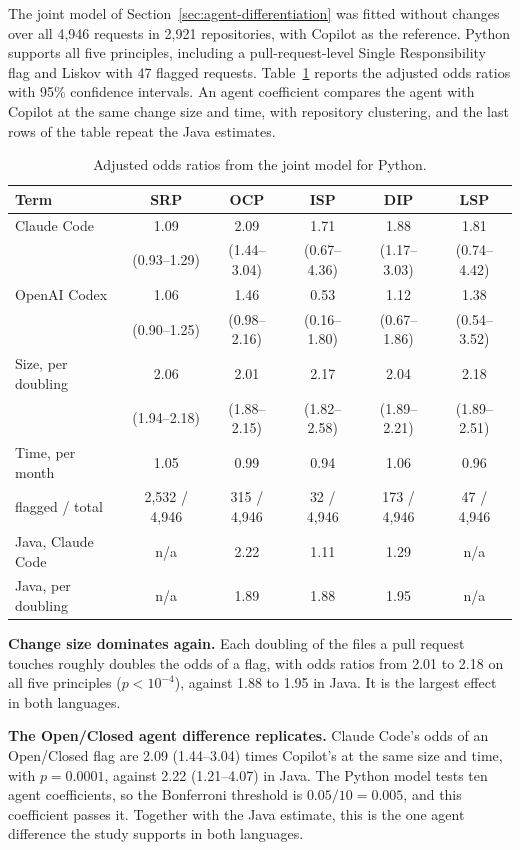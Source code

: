 The joint model of Section~\ref{sec:agent-differentiation} was fitted without changes over all
4{,}946 requests in 2{,}921 repositories, with Copilot as the reference. Python supports all five
principles, including a pull-request-level Single Responsibility flag and Liskov with 47 flagged
requests. Table~\ref{tab:py-model} reports the adjusted odds ratios with 95\% confidence intervals. An
agent coefficient compares the agent with Copilot at the same change size and time, with repository
clustering, and the last rows of the table repeat the Java estimates.

\begin{table}[htb]
\centering
\caption{Adjusted odds ratios from the joint model for Python.}
\label{tab:py-model}
\small
\begin{tabular}{@{}lccccc@{}}
\toprule
\textbf{Term} & \textbf{SRP} & \textbf{OCP} & \textbf{ISP} & \textbf{DIP} & \textbf{LSP} \\
\midrule
Claude Code & 1.09 & 2.09 & 1.71 & 1.88 & 1.81 \\
 & (0.93--1.29) & (1.44--3.04) & (0.67--4.36) & (1.17--3.03) & (0.74--4.42) \\
OpenAI Codex & 1.06 & 1.46 & 0.53 & 1.12 & 1.38 \\
 & (0.90--1.25) & (0.98--2.16) & (0.16--1.80) & (0.67--1.86) & (0.54--3.52) \\
Size, per doubling & 2.06 & 2.01 & 2.17 & 2.04 & 2.18 \\
 & (1.94--2.18) & (1.88--2.15) & (1.82--2.58) & (1.89--2.21) & (1.89--2.51) \\
Time, per month & 1.05 & 0.99 & 0.94 & 1.06 & 0.96 \\
\midrule
flagged / total & 2{,}532 / 4{,}946 & 315 / 4{,}946 & 32 / 4{,}946 & 173 / 4{,}946 & 47 / 4{,}946 \\
\midrule
Java, Claude Code & n/a & 2.22 & 1.11 & 1.29 & n/a \\
Java, per doubling & n/a & 1.89 & 1.88 & 1.95 & n/a \\
\bottomrule
\end{tabular}
\end{table}

\textbf{Change size dominates again.} Each doubling of the files a pull request touches roughly
doubles the odds of a flag, with odds ratios from 2.01 to 2.18 on all five principles ($p < 10^{-4}$),
against 1.88 to 1.95 in Java. It is the largest effect in both languages.

\textbf{The Open/Closed agent difference replicates.} Claude Code's odds of an Open/Closed flag are
2.09 (1.44--3.04) times Copilot's at the same size and time, with $p = 0.0001$, against 2.22
(1.21--4.07) in Java. The Python model tests ten agent coefficients, so the Bonferroni threshold is
$0.05/10 = 0.005$, and this coefficient passes it. Together with the Java estimate, this is the one
agent difference the study supports in both languages.

